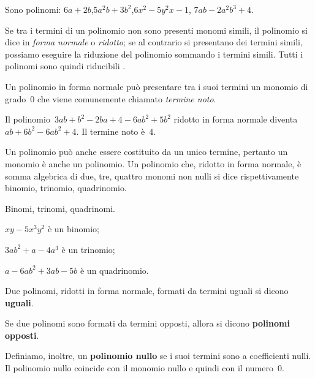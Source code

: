 \begin{esempio}{}{}
Sono polinomi:
\(6a+2b\),\quad \(5a^2b+3b^2\),\quad \(6x^2-5y^2x-1\),\quad 
\(7ab-2a^2b^3+4\).
\end{esempio}

Se tra i termini di un polinomio non sono presenti monomi simili, il 
polinomio si dice in \emph{forma normale} o
\emph{ridotto}; se al contrario si presentano dei termini simili, 
possiamo eseguire la riduzione del polinomio sommando i termini simili. 
Tutti i polinomi sono quindi riducibili 
.

Un polinomio in forma normale può presentare tra i suoi termini un 
monomio di grado~0 che viene comunemente chiamato 
\emph{termine noto}.

\begin{esempio}{}{}
Il polinomio~\(3ab+b^2-2ba+4-6ab^2+5b^2\) ridotto in forma normale 
diventa~\(ab+6b^2-6ab^2+4\). Il termine noto è~\(4\).
\end{esempio}


Un polinomio può anche essere costituito da un unico termine, pertanto 
un monomio è anche un polinomio.
Un polinomio che, ridotto in forma normale, è somma algebrica di due, 
tre, quattro monomi non nulli si dice rispettivamente binomio, trinomio, 
quadrinomio.

\begin{esempio}{}{}
Binomi, trinomi, quadrinomi.
\begin{enumeratea}
\item \(xy-5x^3y^2\) \quad è un binomio;
\item \(3ab^2 +a-4a^3\) \quad è un trinomio;
\item \(a-6ab^2+3ab-5b\) \quad è un quadrinomio.
\end{enumeratea}
\end{esempio}

\begin{definizione}{}{}
Due polinomi, ridotti in forma normale, formati da termini uguali si dicono 
\textbf{uguali}.


Se due polinomi sono formati da termini opposti, allora si dicono 
\textbf{polinomi opposti}.

Definiamo, inoltre, un \textbf{polinomio nullo} se i suoi termini sono
a coefficienti nulli. 
Il polinomio nullo coincide con il monomio nullo e quindi con il numero~0.
\end{definizione}

